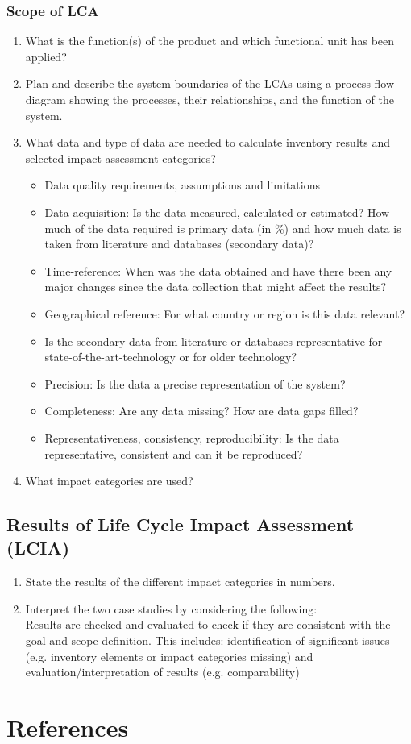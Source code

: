 \documentclass[9pt]{extarticle}
\begin{document}
\subsubsection{Scope of LCA}
\begin{enumerate}
    \renewcommand{\labelenumi}{\alph{enumi})}
    \setcounter{enumi}{4}
    \item What is the function(s) of the product and which functional unit has been applied?
    \item Plan and describe the system boundaries of the LCAs using a process flow diagram showing the processes, their relationships, and the function of the system.
    \item What data and type of data are needed to calculate inventory results
    and selected impact assessment categories?
    \begin{itemize}[label=--]
        \item Data quality requirements, assumptions and limitations
        \item Data acquisition: Is the data measured, calculated or estimated? How much of the data required is primary data (in \%) and how much data is taken from literature and databases (secondary data)?
        \item Time-reference: When was the data obtained and have there been any major changes since the data collection that might affect the results?
        \item Geographical reference: For what country or region is this data relevant?
        \item Is the secondary data from literature or databases representative for state-of-the-art-technology or for older technology?
        \item Precision: Is the data a precise representation of the system?
        \item Completeness: Are any data missing? How are data gaps filled?
        \item Representativeness, consistency, reproducibility: Is the data representative, consistent and can it be reproduced?
    \end{itemize}
    \item What impact categories are used?
\end{enumerate}

\subsection{Results of Life Cycle Impact Assessment (LCIA)}
\begin{enumerate}
    \renewcommand{\labelenumi}{\alph{enumi})}
    \item State the results of the different impact categories in numbers.
    \item Interpret the two case studies by considering the following:\\
        Results are checked and evaluated to check if they are consistent with the goal and scope definition. This includes: identification of significant issues
        (e.g. inventory elements or impact categories missing) and evaluation/interpretation of results (e.g. comparability)
\end{enumerate}

\newpage
\section{References}
\begingroup
\sloppy
\setlength{\emergencystretch}{3em}
\printbibliography
\par
\endgroup
\end{document}
